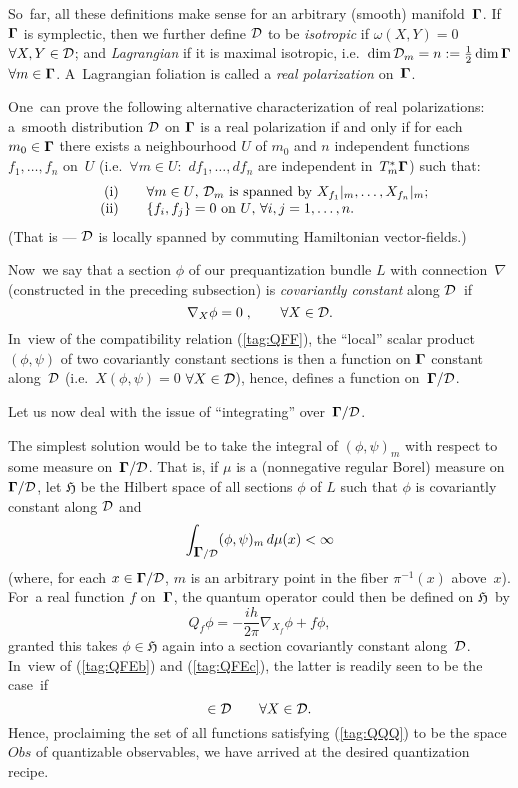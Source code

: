\documentclass[12pt]{amsart}
\numberwithin{equation}{section}
\theoremstyle{remark}
\newcommand\Obs{Obs}
\newcommand\Omg{{\bigam}}   %
\newcommand\DD{{\Cal D}}
\newcommand\MD{{\Omg/\DD}}
\newcommand\HH{\mathfrak H}
\newcommand{\bigam}{\mbox{\boldmath $\Gamma$}}
\begin{document}
So~far, all these definitions make sense for an arbitrary (smooth)
manifold~$\Omg$. If~$\Omg$ is symplectic, then we further define $\DD$ to
be {\it isotropic\/} if $\omega(X,Y)=0$ $\forall X,Y\in\DD$; and
{\it Lagrangian\/} if it is maximal isotropic,
i.e.~$\dim\DD_m=n:=\frac12\dim \Omg$ $\forall m\in \Omg$.
A~Lagrangian foliation is called a {\it real polarization\/} on~$\Omg$.

One~can prove the following alternative characterization of real polarizations:
a~smooth distribution $\DD$ on $\Omg$ is a real polarization if and only if for
each $m_0\in \Omg$ there exists a neighbourhood $U$ of $m_0$ and $n$
independent functions $f_1,\dots,f_n$ on~$U$ (i.e.~$\forall m\in U:$
$df_1,\dots,df_n$ are independent in~$T^*_m \Omg$) such that:
\begin{equation}  \begin{array}{rl}
\text{(i) }&\text{$\forall m\in U$, $\DD_m$ is spanned by $X_{f_1}|_m,\dots,
X_{f_n}|_m$;}\\
\text{(ii) }&\text{$\{f_i,f_j\}=0$ on $U$, $\forall i,j=1,\dots,n$.}
\end{array}  \label{tag:REALPOL}  \end{equation}
(That is --- $\DD$ is locally spanned by commuting Hamiltonian vector-fields.)

Now~we say that a section $\phi$ of our prequantization bundle $L$ with
connection~$\nabla$ (constructed in the preceding subsection) is {\sl
covariantly constant\/} along $\DD$~if
$$ \nabla_X \phi=0\; ,  \qquad \forall X\in \DD.  $$
In~view of the compatibility relation (\ref{tag:QFF}), the ``local'' scalar
product $(\phi,\psi)$ of two covariantly constant sections is then a function
on $\Omg$ constant along~$\DD$ (i.e.~$X(\phi,\psi)=0$ $\forall X\in\DD$),
hence, defines a function on~$\MD$.

Let us now deal with the issue of ``integrating'' over~$\MD$.

The simplest solution would be to take the integral of $(\phi,\psi)_m$ with
respect to some measure on~$\MD$. That is, if $\mu$ is a (nonnegative regular
Borel) measure on~$\MD$, let $\HH$ be the Hilbert space of all sections
$\phi$ of $L$ such that $\phi$ is covariantly constant along $\DD$ and
$$ \int_{\MD} (\phi,\psi)_m \, d\mu(x) <\infty  $$
(where, for each $x\in \MD$, $m$ is an arbitrary point in the fiber
$\pi^{-1}(x)$ above~$x$). For~a real function $f$ on~$\Omg$, the quantum
operator could then be defined on $\HH$~by
\begin{equation}  Q_f \phi = -\frac{ih}{2\pi} \nabla_{X_f} \phi + f\phi,
\label{tag:QPP}  \end{equation}
granted this takes $\phi\in\HH$ again into a section covariantly constant
along~$\DD$. In~view of (\ref{tag:QFEb}) and (\ref{tag:QFEc}), the latter is
readily seen to be the case~if
\begin{equation}  [X_f,X]\in\DD \qquad\forall X\in\DD.   \label{tag:QQQ}
\end{equation}
Hence, proclaiming the set of all functions satisfying (\ref{tag:QQQ}) to be
the space $\Obs$ of quantizable observables, we have arrived at the desired
quantization recipe.
\end{document}
